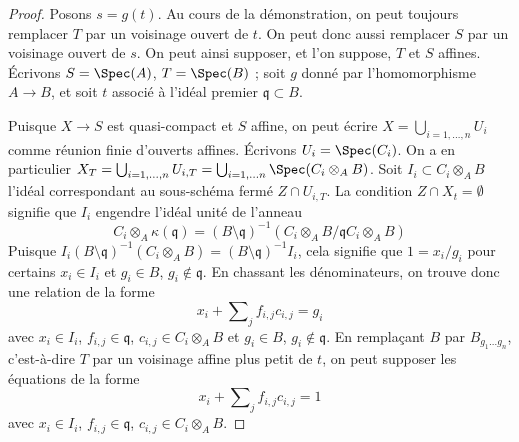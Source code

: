 \begin{proof}
Posons $s = g(t)$. Au cours de la démonstration, on peut toujours remplacer $T$ par un
voisinage ouvert de $t$. On peut donc aussi remplacer $S$ par un voisinage ouvert
de $s$. On peut ainsi supposer, et l'on suppose, $T$ et $S$ affines.
Écrivons $S = \Spec(A)$, $T = \Spec(B)$ ; soit $g$ donné par
l'homomorphisme $A \to B$, et soit $t$ associé à l'idéal premier
$\mathfrak q \subset B$.

\medskip\noindent
Puisque $X \to S$ est quasi-compact et $S$ affine, on peut écrire
$X = \bigcup_{i = 1, \ldots, n} U_i$ comme réunion finie d'ouverts affines.
Écrivons $U_i = \Spec(C_i)$. On a en particulier
$X_T = \bigcup_{i = 1, \ldots, n} U_{i, T} =
\bigcup_{i = 1, \ldots n} \Spec(C_i \otimes_A B)$.
Soit $I_i \subset C_i \otimes_A B$ l'idéal correspondant au
sous-schéma fermé $Z \cap U_{i, T}$. La condition
$Z \cap X_t = \emptyset$ signifie que $I_i$ engendre
l'idéal unité de l'anneau
$$
C_i \otimes_A \kappa(\mathfrak q) =
(B \setminus \mathfrak q)^{-1}\left(
C_i \otimes_A B/\mathfrak q C_i \otimes_A B \right)
$$
Puisque $I_i (B \setminus \mathfrak q)^{-1}(C_i \otimes_A B) =
(B \setminus \mathfrak q)^{-1} I_i$, cela signifie que $1 = x_i/g_i$
pour certains $x_i \in I_i$ et $g_i \in B$, $g_i \not \in \mathfrak q$.
En chassant les dénominateurs, on trouve donc une relation de la forme
$$
x_i + \sum\nolimits_j f_{i, j}c_{i, j} = g_i
$$
avec $x_i \in I_i$, $f_{i, j} \in \mathfrak q$, $c_{i, j} \in C_i \otimes_A B$
et $g_i \in B$, $g_i \not \in \mathfrak q$. En remplaçant $B$ par
$B_{g_1 \ldots g_n}$, c'est-à-dire $T$ par un voisinage affine plus petit
de $t$, on peut supposer les équations de la forme
$$
x_i + \sum\nolimits_j f_{i, j}c_{i, j} = 1
$$
avec $x_i \in I_i$, $f_{i, j} \in \mathfrak q$, $c_{i, j} \in C_i \otimes_A B$.


\end{proof}
